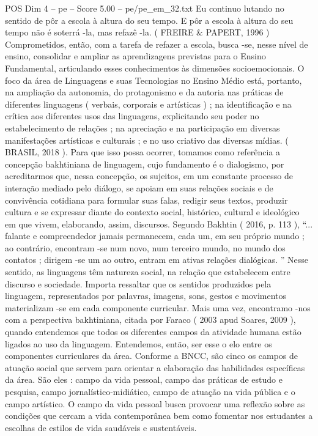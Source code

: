 \begin{textsample}{POS Dim 4 – pe – Score 5.00 – pe/pe\_em\_32.txt}
Eu continuo lutando no sentido de pôr a escola à altura do seu tempo.
E pôr a escola à altura do seu tempo não é soterrá -la, mas refazê -la. ( FREIRE \& PAPERT, 1996 ) Comprometidos, então, com a tarefa de refazer a escola, busca -se, nesse nível de ensino, consolidar e ampliar as aprendizagens previstas para o Ensino Fundamental, articulando esses conhecimentos às dimensões socioemocionais.
O foco da área de Linguagens e suas Tecnologias no Ensino Médio está, portanto, na ampliação da autonomia, do protagonismo e da autoria nas práticas de diferentes linguagens ( verbais, corporais e artísticas ) ; na identificação e na crítica aos diferentes usos das linguagens, explicitando seu poder no estabelecimento de relações ; na apreciação e na participação em diversas manifestações artísticas e culturais ; e no uso criativo das diversas mídias. ( BRASIL, 2018 ).
Para que isso possa ocorrer, tomamos como referência a concepção bakhtiniana de linguagem, cujo fundamento é o dialogismo, por acreditarmos que, nessa concepção, os sujeitos, em um constante processo de interação mediado pelo diálogo, se apoiam em suas relações sociais e de convivência cotidiana para formular suas falas, redigir seus textos, produzir cultura e se expressar diante do contexto social, histórico, cultural e ideológico em que vivem, elaborando, assim, discursos.
Segundo Bakhtin ( 2016, p. 113 ), “... falante e compreendedor jamais permanecem, cada um, em seu próprio mundo ; ao contrário, encontram -se num novo, num terceiro mundo, no mundo dos contatos ; dirigem -se um ao outro, entram em ativas relações dialógicas. ” Nesse sentido, as linguagens têm natureza social, na relação que estabelecem entre discurso e sociedade.
Importa ressaltar que os sentidos produzidos pela linguagem, representados por palavras, imagens, sons, gestos e movimentos materializam -se em cada componente curricular.
Mais uma vez, encontramo -nos com a perspectiva bakhtiniana, citada por Faraco ( 2003 apud Soares, 2009 ), quando entendemos que todos os diferentes campos da atividade humana estão ligados ao uso da linguagem.
Entendemos, então, ser esse o elo entre os componentes curriculares da área.
Conforme a BNCC, são cinco os campos de atuação social que servem para orientar a elaboração das habilidades específicas da área.
São eles : campo da vida pessoal, campo das práticas de estudo e pesquisa, campo jornalístico-midiático, campo de atuação na vida pública e o campo artístico.
O campo da vida pessoal busca provocar uma reflexão sobre as condições que cercam a vida contemporânea bem como fomentar nos estudantes a escolhas de estilos de vida saudáveis e sustentáveis.

\end{textsample}
